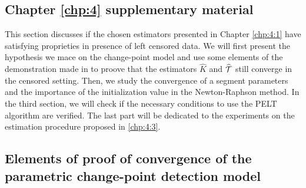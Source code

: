 \begin{appendices}
\chapter{Chapter \ref{chp:4} supplementary material} \label{app:chap4}

This section discusses if the chosen estimators presented in Chapter \ref{chp:4:1} have satisfying proprieties in presence of left censored data. We will first present the hypothesis we mace on the change-point model and use some elements of the demonstration made in \cite{Lavielle1997} to proove that the estimators $\widehat{K}$ and $\widehat{{\mathcal T}}$ still converge in the censored setting. Then, we study the convergence of a segment parameters and the importance of the initialization value in the Newton-Raphson method. In the third section, we will check if the necessary conditions to use the PELT algorithm are verified. The last part will be dedicated to the experiments on the estimation procedure proposed in \ref{chp:4:3}. 

\section{Elements of proof of convergence of the parametric change-point detection model}\label{app:chap4:1}



\end{appendices}
